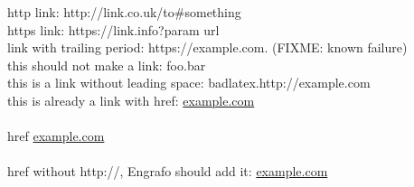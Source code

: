 \documentclass{article}
\begin{document}
  http link: http://link.co.uk/to\#something \\
  https link: https://link.info?param url \\
  link with trailing period: https://example.com. (FIXME: known failure) \\
  this should not make a link: foo.bar \\
  this is a link without leading space: badlatex.http://example.com \\
  this is already a link with href: \href{http://example.com}{example.com} \\
  \\href \href{http://example.com}{example.com} \\
  \\href without http://, Engrafo should add it: \href{example.com}{example.com} \\
\end{document}
